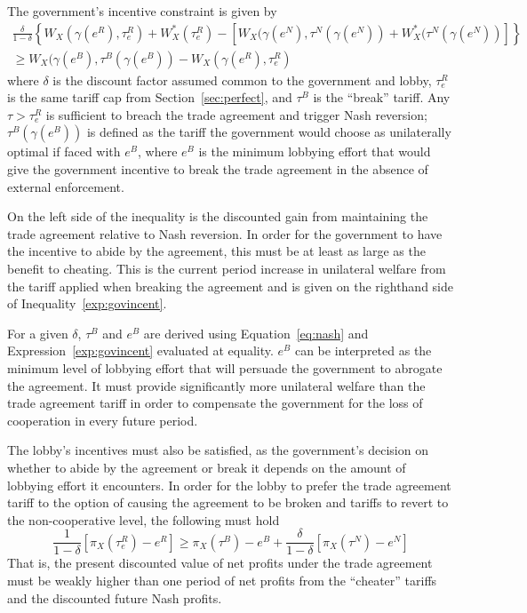 \documentclass[12pt]{article}
\newcommand{\ga}{\gamma}
\newcommand{\de}{\delta}
\begin{document}
The government's incentive constraint is given by
  \begin{multline}
    \frac{\de}{1-\de} \left\{W_X(\ga(e^R),\tau_e^R) + W_X^*(\tau_e^R) - \left[W_X(\ga(e^N),\tau^N(\ga(e^N)) + W_X^*(\tau^N(\ga(e^N)) \right] \right\} \\ \geq W_X(\ga(e^B),\tau^B(\ga(e^B)) - W_X(\ga(e^R),\tau_e^R)
		\label{exp:govincent}
  \end{multline}
where $\de$ is the discount factor assumed common to the government and lobby, $\tau_e^R$ is the same tariff cap from Section~\ref{sec:perfect}, and $\tau^B$ is the ``break'' tariff. Any $\tau > \tau_e^R$ is sufficient to breach the trade agreement and trigger Nash reversion; $\tau^B(\ga(e^B))$ is defined as the tariff the government would choose as unilaterally optimal if faced with $e^B$, where $e^B$ is the minimum lobbying effort that would give the government incentive to break the trade agreement in the absence of external enforcement.

On the left side of the inequality is the discounted gain from maintaining the trade agreement relative to Nash reversion. In order for the government to have the incentive to abide by the agreement, this must be at least as large as the benefit to cheating. This is the current period increase in unilateral welfare from the tariff applied when breaking the agreement and is given on the righthand side of Inequality~\ref{exp:govincent}.

For a given $\de$, $\tau^B$ and $e^B$ are derived using Equation~\ref{eq:nash} and Expression~\ref{exp:govincent} evaluated at equality. $e^B$ can be interpreted as the minimum level of lobbying effort that will persuade the government to abrogate the agreement. It must provide significantly more unilateral welfare than the trade agreement tariff in order to compensate the government for the loss of cooperation in every future period.

The lobby's incentives must also be satisfied, as the government's decision on whether to abide by the agreement or break it depends on the amount of lobbying effort it encounters. In order for the lobby to prefer the trade agreement tariff to the option of causing the agreement to be broken and tariffs to revert to the non-cooperative level, the following must hold
\begin{equation}
  \frac{1}{1-\de}\left[\pi_X(\tau_e^R) - e^R\right] \geq \pi_X(\tau^B) - e^B + \frac{\de}{1-\de}\left[\pi_X(\tau^N) - e^N\right]
	\label{exp:lobby}
\end{equation}
That is, the present discounted value of net profits under the trade agreement must be weakly higher than one period of net profits from the ``cheater'' tariffs and the discounted future Nash profits.
\end{document}
